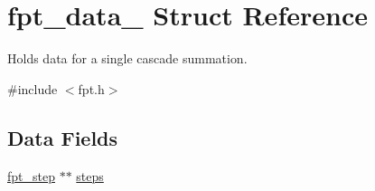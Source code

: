 \hypertarget{structfpt__data__}{\section{fpt\-\_\-data\-\_\- Struct Reference}
\label{structfpt__data__}
}


Holds data for a single cascade summation.  




{\ttfamily \#include $<$fpt.\-h$>$}

\subsection*{Data Fields}
\begin{DoxyCompactItemize}
\item 
\hypertarget{structfpt__data___ae511611ff434c5134446a77ec6053854}{\hyperlink{fpt_8c_a4c7f62127651d301d4604b3a6519458d}{fpt\-\_\-step} $\ast$$\ast$ \hyperlink{structfpt__data___ae511611ff434c5134446a77ec6053854}{steps}}\label{structfpt__data___ae511611ff434c5134446a77ec6053854}


\end{DoxyCompactItemize}
